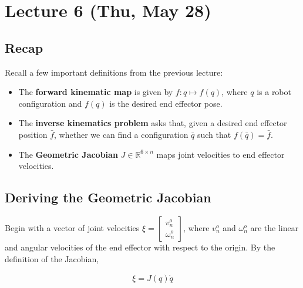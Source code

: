 \documentclass[../../master-handout.tex]{subfiles}
\begin{document}
\section{Lecture 6 (Thu, May 28)}

\subsection{Recap}
Recall a few important definitions from the previous lecture:
\begin{itemize}
    \item The \textbf{forward kinematic map} is given by $f: q \mapsto f(q)$, where $q$ is a robot configuration and $f(q)$ is the desired end effector pose.
    \item The \textbf{inverse kinematics problem} asks that, given a desired end effector position $\bar{f}$, whether we can find a configuration $\bar{q}$ such that $f(\bar{q}) = \bar{f}$.
    \item The \textbf{Geometric Jacobian} $J \in \mathbb{R}^{6\times n}$ maps joint velocities to end effector velocities. 
\end{itemize}

\subsection{Deriving the Geometric Jacobian}
Begin with a vector of joint velocities $\xi = \begin{bmatrix} v_n^o \\ \omega_n^o \end{bmatrix}$, where $v_n^o$ and $\omega_n^o$ are the linear and angular velocities of the end effector with respect to the origin. By the definition of the Jacobian,

\begin{align*}
    \xi = J(q) \dot{q}
\end{align*}
\end{document}
